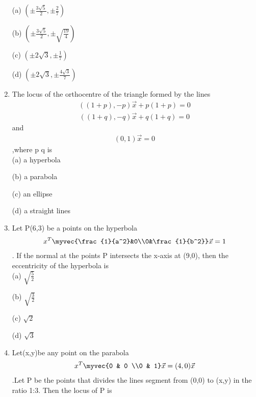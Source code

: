 \begin{enumerate}
\choice (a) $(\pm{\frac{3\sqrt{5}}{2}}, \pm{\frac{2}{7}})$

\choice (b) $(\pm{\frac{3\sqrt{5}}{2}}, \pm{\sqrt{\frac{19}{4}}})$

\choice (c) $(\pm 2\sqrt{3}, \pm{\frac{1}{7}})$

\choice (d) $(\pm 2\sqrt{3}, \pm{\frac{4\sqrt{3}}{7}})$\\

\item The locus of the orthocentre of the triangle formed by the lines \begin{align}((1+p),-p)\vec x+p(1+p)=0\end{align} \begin{align}((1+q),-q)\vec x+q(1+q)=0\end{align}and \begin{align}(0,1)\vec x=0\end{align},where p \neq q is \\

\choice (a) a hyperbola

\choice (b) a parabola

\choice (c) an ellipse

\choice (d) a straight lines\\

\item Let P(6,3) be a points on the hyperbola \begin{align} x^T\myvec {\frac{1}{a^2}&0\\0&\frac{1}{b^2}} \vec x =1\end{align}. If the normal at the points P intersects the x-axis at (9,0), then the eccentricity of the hyperbola is\\ 

\choice (a) $\sqrt{\frac{5}{2}}$

\choice (b) $\sqrt{\frac{3}{2}}$

\choice (c) $\sqrt{2}$

\choice (d)  $\sqrt{3}$\\

\item Let(x,y)be any point on the parabola \begin{align} x^T \myvec {0 & 0 \\0 & 1}\vec x=(4,0)\vec x \end{align}.Let P be the points that divides the lines segment from (0,0) to (x,y) in the ratio 1:3. Then the locus of P is \\
    

\end{enumerate}
